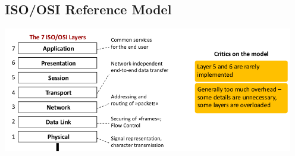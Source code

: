 \documentclass[11pt,ngerman]{article}
\begin{document}
\subsection{ISO/OSI Reference Model}
\includegraphics[width=5in]{images/Selection_011.png}\\
\end{document}
